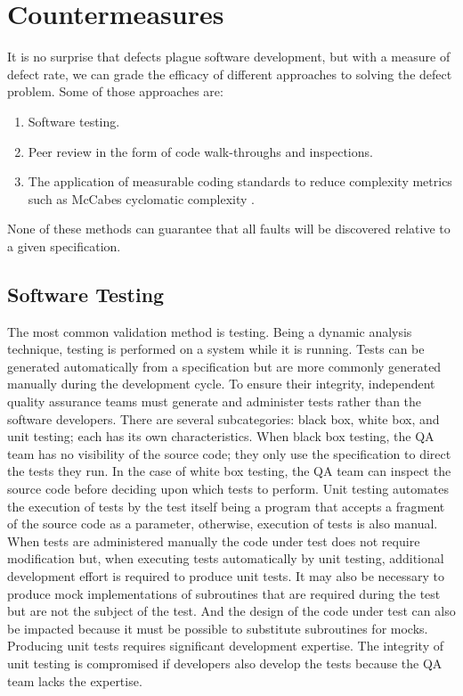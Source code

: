 \section{Countermeasures}

It is no surprise that defects plague software development, but with a measure of defect rate, we can grade the efficacy of different approaches to solving the defect problem.  Some of those approaches are:

\begin{enumerate}
\item Software testing.
\item Peer review in the form of code walk-throughs and inspections.
\item The application of measurable coding standards to reduce complexity metrics such as McCabes cyclomatic complexity \cite{CodeCompleteMcCabe}.
\end{enumerate}

\noindent None of these methods can guarantee that all faults will be discovered relative to a given specification.\\

\subsection{Software Testing}
\label{subSec:Testing}

The most common validation method is testing.  Being a dynamic analysis technique, testing is performed on a system while it is running.  Tests can be generated automatically from a specification but are more commonly generated manually during the development cycle.  To ensure their integrity, independent quality assurance teams must generate and administer tests rather than the software developers.  There are several subcategories: black box, white box, and unit testing; each has its own characteristics.  When black box testing, the QA team has no visibility of the source code; they only use the specification to direct the tests they run.  In the case of white box testing, the QA team can inspect the source code before deciding upon which tests to perform.  Unit testing automates the execution of tests by the test itself being a program that accepts a fragment of the source code as a parameter, otherwise, execution of tests is also manual.  When tests are administered manually the code under test does not require modification but, when executing tests automatically by unit testing, additional development effort is required to produce unit tests.  It may also be necessary to produce mock implementations of subroutines that are required during the test but are not the subject of the test.  And the design of the code under test can also be impacted because it must be possible to substitute subroutines for mocks.  Producing unit tests requires significant development expertise.  The integrity of unit testing is compromised if developers also develop the tests because the QA team lacks the expertise.

